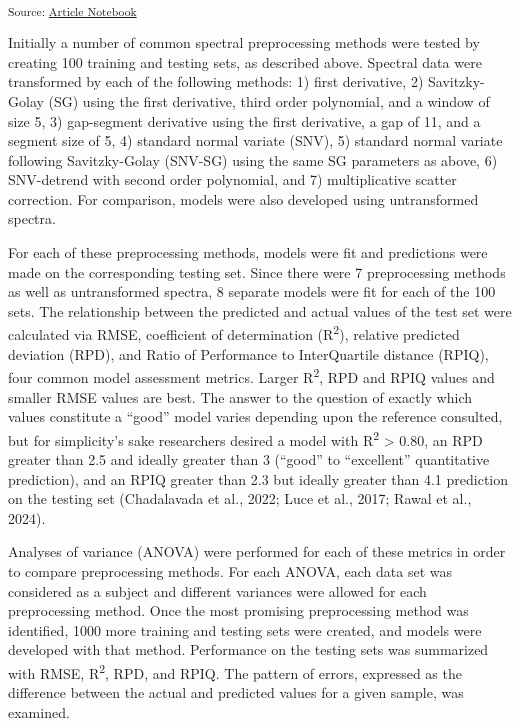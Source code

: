 \documentclass[
]{agujournal2019}
\begin{document}
\textsubscript{Source:
\href{https://rvcrawford.github.io/glowing-system/index.qmd.html}{Article
Notebook}}

Initially a number of common spectral preprocessing methods were tested
by creating 100 training and testing sets, as described above. Spectral
data were transformed by each of the following methods: 1) first
derivative, 2) Savitzky-Golay (SG) using the first derivative, third
order polynomial, and a window of size 5, 3) gap-segment derivative
using the first derivative, a gap of 11, and a segment size of 5, 4)
standard normal variate (SNV), 5) standard normal variate following
Savitzky-Golay (SNV-SG) using the same SG parameters as above, 6)
SNV-detrend with second order polynomial, and 7) multiplicative scatter
correction. For comparison, models were also developed using
untransformed spectra.

For each of these preprocessing methods, models were fit and predictions
were made on the corresponding testing set. Since there were 7
preprocessing methods as well as untransformed spectra, 8 separate
models were fit for each of the 100 sets. The relationship between the
predicted and actual values of the test set were calculated via RMSE,
coefficient of determination (R\textsuperscript{2}), relative predicted
deviation (RPD), and Ratio of Performance to InterQuartile distance
(RPIQ), four common model assessment metrics. Larger
R\textsuperscript{2}, RPD and RPIQ values and smaller RMSE values are
best. The answer to the question of exactly which values constitute a
``good'' model varies depending upon the reference consulted, but for
simplicity's sake researchers desired a model with R\textsuperscript{2}
\textgreater{} 0.80, an RPD greater than 2.5 and ideally greater than 3
(``good'' to ``excellent'' quantitative prediction), and an RPIQ greater
than 2.3 but ideally greater than 4.1 prediction on the testing set
(Chadalavada et al., 2022; Luce et al., 2017; Rawal et al., 2024).

Analyses of variance (ANOVA) were performed for each of these metrics in
order to compare preprocessing methods. For each ANOVA, each data set
was considered as a subject and different variances were allowed for
each preprocessing method. Once the most promising preprocessing method
was identified, 1000 more training and testing sets were created, and
models were developed with that method. Performance on the testing sets
was summarized with RMSE, R\textsuperscript{2}, RPD, and RPIQ. The
pattern of errors, expressed as the difference between the actual and
predicted values for a given sample, was examined.
\end{document}
